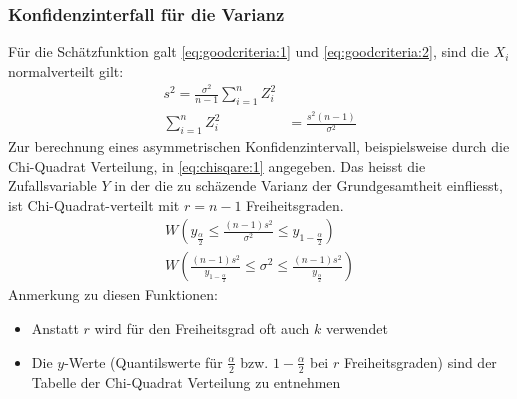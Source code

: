 \subsubsection{Konfidenzinterfall für die Varianz}
Für die Schätzfunktion galt \autoref{eq:goodcriteria:1} und \autoref{eq:goodcriteria:2}, sind die $X_i$ normalverteilt gilt:
\begin{align}
s^2=\frac{\sigma^2}{n-1}\sum^n_{i=1}Z_i^2& \\
\sum_{i=1}^n Z_i^2& = \frac{s^2(n-1)}{\sigma^2}
\end{align}
Zur berechnung eines asymmetrischen Konfidenzintervall, beispielsweise durch die Chi-Quadrat Verteilung, in \autoref{eq:chisqare:1} angegeben. Das heisst die Zufallsvariable $Y$ in der die zu schäzende Varianz der Grundgesamtheit einfliesst, ist Chi-Quadrat-verteilt mit $r=n-1$ Freiheitsgraden.
\begin{align}
W\left(y_{\frac{\alpha}{2}} \leq \frac{(n-1)s^2}{\sigma^2} \leq y_{1-\frac{\alpha}{2}}\right)\\
W\left(\frac{(n-1)s^2}{y_{1-\frac{\alpha}{2}}} \leq\sigma^2 \leq\frac{(n-1)s^2}{y_{\frac{\alpha}{2}}}\right)
\end{align}
Anmerkung zu diesen Funktionen:
\begin{itemize}
\item Anstatt $r$ wird für den Freiheitsgrad oft auch $k$ verwendet
\item Die $y$-Werte (Quantilswerte für $\frac{\alpha}{2}$ bzw. $1-\frac{\alpha}{2}$ bei $r$ Freiheitsgraden) sind der Tabelle der Chi-Quadrat Verteilung zu entnehmen
\end{itemize}
